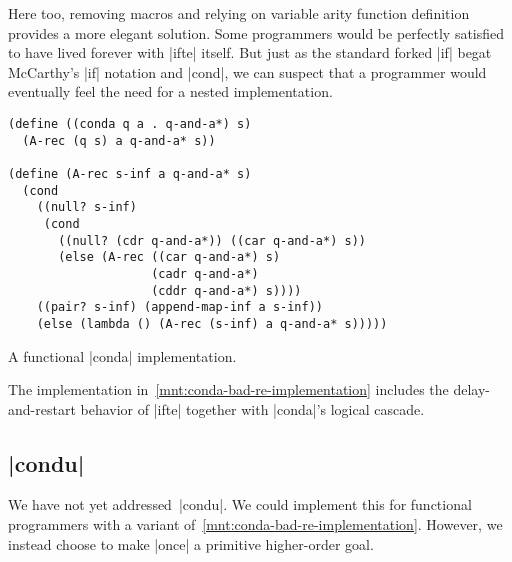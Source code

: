 \documentclass[sigplan,screen,draft,anonymous,review,natbib=false]{acmart}
\begin{document}
Here too, removing macros and relying on variable arity function
definition provides a more elegant solution. Some programmers would be
perfectly satisfied to have lived forever with \rackinline|ifte|
itself. But just as the standard forked \rackinline|if| begat
McCarthy's \rackinline|if| notation and \rackinline|cond|, we can
suspect that a programmer would eventually feel the need for a nested
implementation.

\begin{listing}
  \begin{verbatim}
(define ((conda q a . q-and-a*) s)
  (A-rec (q s) a q-and-a* s))

(define (A-rec s-inf a q-and-a* s)
  (cond
    ((null? s-inf)
     (cond
       ((null? (cdr q-and-a*)) ((car q-and-a*) s))
       (else (A-rec ((car q-and-a*) s)
                    (cadr q-and-a*)
                    (cddr q-and-a*) s))))
    ((pair? s-inf) (append-map-inf a s-inf))
    (else (lambda () (A-rec (s-inf) a q-and-a* s)))))
  \end{verbatim}
  \caption{A functional \rackinline|conda| implementation.}
  \label{mnt:conda-good-re-implementation}
\end{listing}

The implementation in~\cref{mnt:conda-bad-re-implementation} includes
the delay-and-restart behavior of \rackinline|ifte| together with
\rackinline|conda|'s logical cascade.

\subsection{\rackinline|condu|}

We have not yet addressed~\rackinline|condu|. We could implement this
for functional programmers with a variant
of~\cref{mnt:conda-bad-re-implementation}. However, we instead choose
to make \rackinline|once| a primitive higher-order goal.

\end{document}
